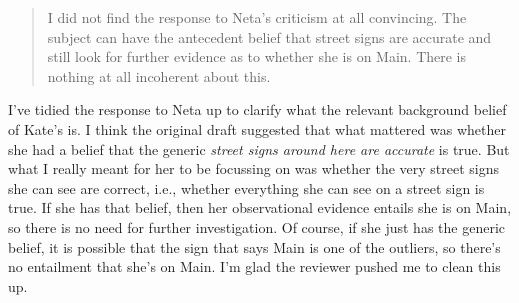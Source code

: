 \documentclass[]{article}
\newcommand{\reviewer}[1]{
\begin{quote}
#1
\end{quote}
\noindent}
\begin{document}
\reviewer{I did not find the response to Neta's criticism at all convincing.   The subject can have the antecedent belief that street signs are accurate and still look for further evidence as to whether she is on Main.  There is nothing at all incoherent about this.}%
I've tidied the response to Neta up to clarify what the relevant background belief of Kate's is. I think the original draft suggested that what mattered was whether she had a belief that the generic \textit{street signs around here are accurate} is true. But what I really meant for her to be focussing on was whether the very street signs she can see are correct, i.e., whether everything she can see on a street sign is true. If she has that belief, then her observational evidence entails she is on Main, so there is no need for further investigation. Of course, if she just has the generic belief, it is possible that the sign that says Main is one of the outliers, so there's no entailment that she's on Main. I'm glad the reviewer pushed me to clean this up.
\end{document}
